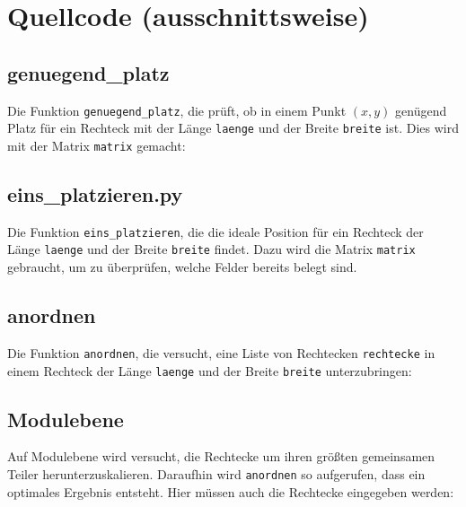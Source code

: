 \documentclass[a4paper,10pt,ngerman]{scrartcl}
\begin{document}
\section{Quellcode (ausschnittsweise)}

\subsection{genuegend\_platz}
Die Funktion \texttt{genuegend\_platz}, die prüft, ob in einem Punkt $(x,y)$ genügend Platz für ein Rechteck mit der Länge \texttt{laenge} und der Breite \texttt{breite} ist. Dies wird mit der Matrix \texttt{matrix} gemacht:


\subsection{eins\_platzieren.py}
Die Funktion \texttt{eins\_platzieren}, die die ideale Position für ein Rechteck der Länge \texttt{laenge} und der Breite \texttt{breite} findet. Dazu wird die Matrix \texttt{matrix} gebraucht, um zu überprüfen, welche Felder bereits belegt sind.


\subsection{anordnen}
Die Funktion \texttt{anordnen}, die versucht, eine Liste von Rechtecken \texttt{rechtecke} in einem Rechteck der Länge \texttt{laenge} und der Breite \texttt{breite} unterzubringen:

   
\subsection{Modulebene}
Auf Modulebene wird versucht, die Rechtecke um ihren größten gemeinsamen Teiler herunterzuskalieren. Daraufhin wird \texttt{anordnen} so aufgerufen, dass ein optimales Ergebnis entsteht. Hier müssen auch die Rechtecke eingegeben werden:



\printbibliography 
\end{document}

